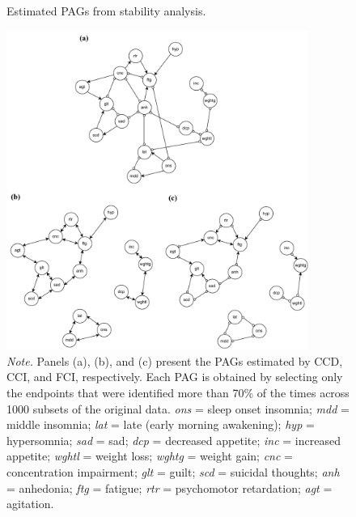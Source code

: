 \documentclass[twoside, 11pt]{article}
\begin{document}
\begin{appendices}
\vspace{3mm}
\begin{figure}[!htbp]
    \centering
        \caption{Estimated PAGs from stability analysis.}
        \includegraphics[width=0.88\textwidth]{figures/FigI1.pdf}
        \vspace{3mm}
        \caption*{\small{\textit{Note.} Panels (a), (b), and (c) present the PAGs estimated by CCD, CCI, and FCI, respectively. Each PAG is obtained by selecting only the endpoints that were identified more than 70\% of the times across 1000 subsets of the original data. \textit{ons} = sleep onset insomnia; \textit{mdd} = middle insomnia; \textit{lat} = late (early morning awakening); \textit{hyp} = hypersomnia; \textit{sad} = sad; \textit{dcp} = decreased appetite; \textit{inc} = increased appetite; \textit{wghtl} = weight loss; \textit{wghtg} = weight gain; \textit{cnc} = concentration impairment; \textit{glt} = guilt; \textit{scd} = suicidal thoughts; \textit{anh} = anhedonia; \textit{ftg} = fatigue; \textit{rtr} = psychomotor retardation; \textit{agt} = agitation.}}
    \label{fig:I1}
\end{figure}


\restoregeometry




\end{appendices}
\end{document}

